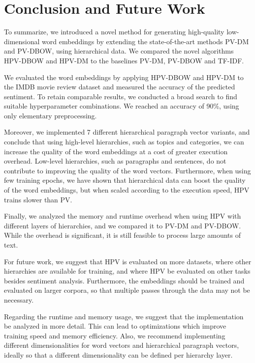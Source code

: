 \chapter{Conclusion and Future Work}\label{conclusion-and-future-work}

To summarize, we introduced a novel method for generating high-quality low-dimensional word embeddings by extending the state-of-the-art methods PV-DM and PV-DBOW, using hierarchical data. We compared the novel algorithms HPV-DBOW and HPV-DM to the baselines PV-DM, PV-DBOW and TF-IDF\@.

We evaluated the word embeddings by applying HPV-DBOW and HPV-DM to the IMDB movie review dataset and measured the accuracy of the predicted sentiment. To retain comparable results, we conducted a broad search to find suitable hyperparameter combinations. We reached an accuracy of 90\%, using only elementary preprocessing.

Moreover, we implemented 7 different hierarchical paragraph vector variants, and conclude that using high-level hierarchies, such as topics and categories, we can increase the quality of the word embeddings at a cost of greater execution overhead. Low-level hierarchies, such as paragraphs and sentences, do not contribute to improving the quality of the word vectors. Furthermore, when using few training epochs, we have shown that hierarchical data can boost the quality of the word embeddings, but when scaled according to the execution speed, HPV trains slower than PV.

Finally, we analyzed the memory and runtime overhead when using HPV with different layers of hierarchies, and we compared it to PV-DM and PV-DBOW\@. While the overhead is significant, it is still feasible to process large amounts of text.

For future work, we suggest that HPV is evaluated on more datasets, where other hierarchies are available for training, and where HPV be evaluated on other tasks besides sentiment analysis. Furthermore, the embeddings should be trained and evaluated on larger corpora, so that multiple passes through the data may not be necessary.

Regarding the runtime and memory usage, we suggest that the implementation be analyzed in more detail. This can lead to optimizations which improve training speed and memory efficiency. Also, we recommend implementing different dimensionalities for word vectors and hierarchical paragraph vectors, ideally so that a different dimensionality can be defined per hierarchy layer.

